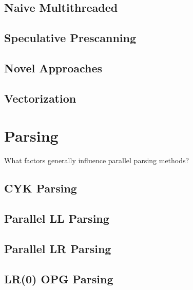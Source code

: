 \subsection{Naive Multithreaded}
\cite{barenghi_parallel_2015, mytkowicz_data-parallel_2014}

\subsection{Speculative Prescanning}
\cite{li_plex_2021}

\subsection{Novel Approaches}
\cite{sinya_simultaneous_2013, lin_accelerating_2013}

\subsection{Vectorization}
\cite{wang_hyperscan_2019}

\section{Parsing}
\begin{sectionplan}
    What factors generally influence parallel parsing methods?
\end{sectionplan}
\cite{mark_thierry_vandevoorde_parallel_1988}

\subsection{CYK Parsing}
\cite{skrzypczak_parallel_nodate}
\subsection{Parallel LL Parsing}
\cite{robin_voetter_parallel_2021}
\subsection{Parallel LR Parsing}
\cite{clarke_error_1993}
\subsection{LR(0) OPG Parsing}
\cite{barenghi_parallel_2015, li_associative_2023}

